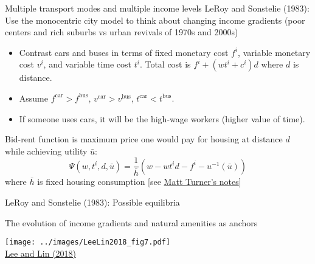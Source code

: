\documentclass[11pt,notes=hide,aspectratio=169]{beamer}
\begin{document}
\begin{frame}{Multiple transport modes and multiple income levels}
LeRoy and Sonstelie (1983):
Use the monocentric city model to think about changing income gradients
(poor centers and rich suburbs vs urban revivals of 1970s and 2000s)
\begin{itemize}
\item Contrast cars and buses in terms of fixed monetary cost $f^i$, variable monetary cost $v^i$, and variable time cost $t^i$. Total cost is $f^i + (w t^i + c^i) d$ where $d$ is distance.
\item Assume $f^{\text{car}} > f^{\text{bus}}$, $v^{\text{car}} > v^{\text{bus}}$, $t^{\text{car}} < t^{\text{bus}}$.
\item If someone uses cars, it will be the high-wage workers (higher value of time).
\end{itemize}
Bid-rent function is maximum price one would pay for housing at distance $d$ while achieving utility $\bar{u}$:
$$
\Psi(w,t^{i},d,\bar{u})
=
\frac{1}{\bar{h}} \left(w - w t^i d - f^i - u^{-1}(\bar{u})\right)
$$
where $\bar{h}$ is fixed housing consumption
[see \href{https://matthewturner.org/ec2410/lectures/4_LeRoySonstelie_v1.pdf}{Matt Turner's notes}]
\end{frame}
\begin{frame}{LeRoy and Sonstelie (1983): Possible equilibria}
\begin{center}
\end{center}
\end{frame}
\begin{frame}{The evolution of income gradients and natural amenities as anchors}
\begin{center}
\texttt{[image: ../images/LeeLin2018\_fig7.pdf]}\\
\vspace{-5mm}
{\scriptsize \href{https://doi.org/10.1093/restud/rdx018}{Lee and Lin (2018)}}
\end{center}
\end{frame}
\end{document}
